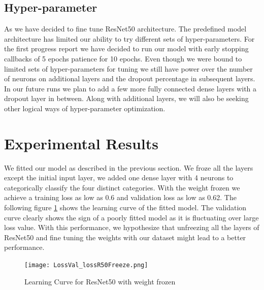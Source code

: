 \documentclass{report}
\begin{document}
\subsection{Hyper-parameter}
As we have decided to fine tune ResNet50 architecture. The predefined model architecture has limited our ability to try different sets of hyper-parameters. For the first progress report we have decided to run our model with early stopping callbacks of 5 epochs patience for 10 epochs. Even though we were bound to limited sets of hyper-parameters for tuning we still have power over the number of neurons on additional layers and the dropout percentage in subsequent layers. In our future runs we plan to add a few more fully connected dense layers with a dropout layer in between. Along with additional layers, we will also be seeking other logical ways of hyper-parameter optimization. 



\section{Experimental Results}
We fitted our model as described in the previous section. We froze all the layers except the initial input layer, we added one dense layer with 4 neurons to categorically classify the four distinct categories. With the weight frozen we achieve a training loss as low as 0.6 and validation loss as low as 0.62. The following figure \ref{fig:Frozen} shows the learning curve of the fitted model. The validation curve clearly shows the sign of a poorly fitted model as it is fluctuating over large loss value. With this performance, we hypothesize that unfreezing all the layers of ResNet50 and fine tuning the weights with our dataset might lead to a better performance. 

\begin{figure}[H]
\centering
\texttt{[image: LossVal\_lossR50Freeze.png]}
\caption{Learning Curve for ResNet50 with weight frozen}
\label{fig:Frozen}
\end{figure}
\end{document}
